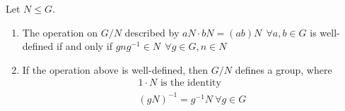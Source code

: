 \begin{proposition}
    \label{prop5}
    Let $N\leq G.$
    \begin{enumerate}
        \item The operation on $G/N$ described by $aN \cdot bN = (ab)N ~~\forall a, b \in G$ is well-defined if and only if $gng^{-1} \in N ~~\forall g \in G, n \in N$
        \item If the operation above is well-defined, then $G/N$ defines a group, where 
        \begin{align*}
            1 \cdot N \text{ is the identity } \\
            (gN)^{-1} = g^{-1}N ~\forall g \in G
        \end{align*}
    \end{enumerate}
\end{proposition}

